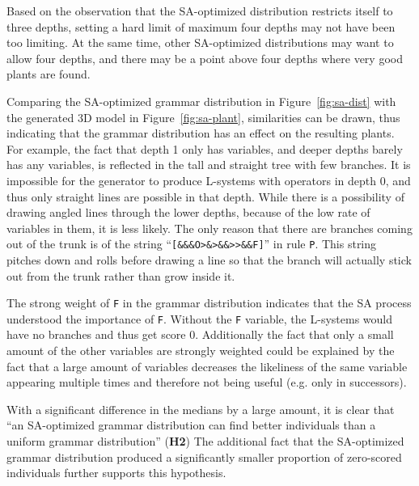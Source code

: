 Based on the observation that the \gls{SA}-optimized distribution restricts itself to three depths, setting a hard limit of maximum four depths may not have been too limiting.
At the same time, other \gls{SA}-optimized distributions may want to allow four depths, and there may be a point above four depths where very good plants are found.

Comparing the \gls{SA}-optimized grammar distribution in Figure~\ref{fig:sa-dist} with the generated 3D model in Figure~\ref{fig:sa-plant}, similarities can be drawn, thus indicating that the grammar distribution has an effect on the resulting plants.
For example, the fact that depth 1 only has variables, and deeper depths barely has any variables, is reflected in the tall and straight tree with few branches.
It is impossible for the generator to produce \glspl{L-system} with operators in depth 0, and thus only straight lines are possible in that depth.
While there is a possibility of drawing angled lines through the lower depths, because of the low rate of variables in them, it is less likely.
The only reason that there are branches coming out of the trunk is of the string ``\texttt{[\&\&\&O>\&>\&\&>{}>\&\&F]}'' in rule \texttt{P}.
This string pitches down and rolls before drawing a line so that the branch will actually stick out from the trunk rather than grow inside it.

The strong weight of \texttt{F} in the grammar distribution indicates that the \gls{SA} process understood the importance of \texttt{F}.
Without the \texttt{F} variable, the \glspl{L-system} would have no branches and thus get score 0.
Additionally the fact that only a small amount of the other variables are strongly weighted could be explained by the fact that a large amount of variables decreases the likeliness of the same variable appearing multiple times and therefore not being useful (e.g. only in successors).

With a significant difference in the medians by a large amount, it is clear that ``an \gls{SA}-optimized grammar distribution can find better individuals than a uniform grammar distribution'' (\textbf{H2})
The additional fact that the \gls{SA}-optimized grammar distribution produced a significantly smaller proportion of zero-scored individuals further supports this hypothesis.

